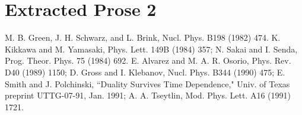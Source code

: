\documentclass[11pt]{article}
\begin{document}
\section{Extracted Prose 2}
M. B. Green, J. H. Schwarz, and L. Brink, Nucl. Phys. B198 (1982) 474. K. Kikkawa and M. Yamasaki, Phys. Lett. 149B (1984) 357; N. Sakai and I. Senda, Prog. Theor. Phys. 75 (1984) 692. E. Alvarez and M. A. R. Osorio, Phys. Rev. D40 (1989) 1150; D. Gross and I. Klebanov, Nucl. Phys. B344 (1990) 475; E. Smith and J. Polchinski, ``Duality Survives Time Dependence," Univ. of Texas preprint UTTG-07-91, Jan. 1991; A. A. Tseytlin, Mod. Phys. Lett. A16 (1991) 1721.
\end{document}
